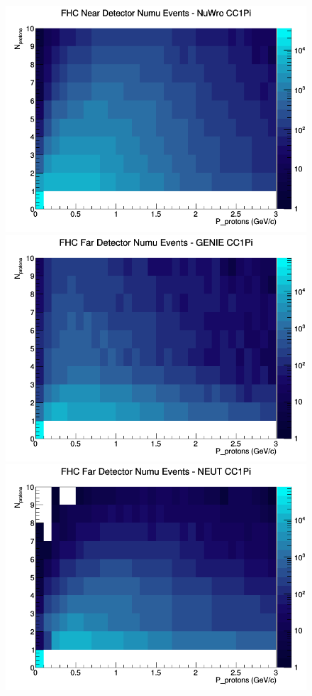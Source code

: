 \documentclass[12pt]{article}
\begin{document}
\begin{figure}[h]
\includegraphics[width=\linewidth]{N_P/nominal/protons/CC1Pi_FHC_ND_numu_N_P_NuWro.png}
\endminipage
\newline
{}
\includegraphics[width=\linewidth]{N_P/nominal/protons/CC1Pi_FHC_FD_numu_N_P_GENIE.png}
\endminipage
{}
\includegraphics[width=\linewidth]{N_P/nominal/protons/CC1Pi_FHC_FD_numu_N_P_NEUT.png}

\end{figure}
\end{document}
